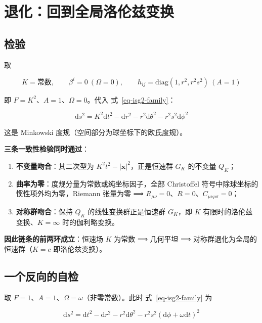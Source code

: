 \documentclass[
  chinese,
  a4paper,
  UTF8,
  12pt,
  oneside,
  openany]{ctexbook}
\providecommand{\tightlist}{%
  \setlength{\itemsep}{0pt}\setlength{\parskip}{0pt}}
\theoremstyle{plain}
\theoremstyle{plain}
\theoremstyle{plain}
\theoremstyle{definition}
\theoremstyle{plain}
\theoremstyle{plain}
\theoremstyle{remark}
\begin{document}
\section{退化：回到全局洛伦兹变换}\label{sec-isg2-degenerate}

\subsection{检验}\label{ux68c0ux9a8c}

取

\[
K=\text{常数},\qquad \beta^{i}=0\ (\Omega=0),\qquad h_{ij}=\mathrm{diag}(1,r^{2},r^{2}s^{2})\ (A=1)
\]

即 \(F=K^{2}\)、\(A=1\)、\(\Omega=0\)。代入 式~\ref{eq-isg2-family}：

\[
\mathrm{d}s^{2}=K^{2}\mathrm{d}t^{2}-\mathrm{d}r^{2}-r^{2}\mathrm{d}\theta^{2}-r^{2}s^{2}\mathrm{d}\phi^{2}
\]

这是 Minkowski 度规（空间部分为球坐标下的欧氏度规）。

\textbf{三条一致性检验同时通过}：

\begin{enumerate}
\def\labelenumi{\arabic{enumi}.}
\tightlist
\item
  \textbf{不变量吻合}：其二次型为
  \(K^{2}t^{2}-\lvert\mathbf{x}\rvert^{2}\)，正是恒速群 \(G_{K}\)
  的不变量 \(Q_K\)；
\item
  \textbf{曲率为零}：度规分量为常数或纯坐标因子，全部 Christoffel
  符号中除球坐标的惯性项外均为零，Riemann 张量为零 ⟹
  \(R_{\mu\nu}=0\)、\(R=0\)、\(C_{\mu\nu\rho\sigma}=0\)；
\item
  \textbf{对称群吻合}：保持 \(Q_K\) 的线性变换群正是恒速群 \(G_K\)，即
  \(K\) 有限时的洛伦兹变换、\(K=\infty\) 时的伽利略变换。
\end{enumerate}

\textbf{因此链条的前两环成立}：恒速场 \(K\) 为常数 ⟹ 几何平坦 ⟹
对称群退化为全局的恒速群（\(K=c\) 即洛伦兹变换）。

\subsection{一个反向的自检}\label{ux4e00ux4e2aux53cdux5411ux7684ux81eaux68c0}

取 \(F=1\)、\(A=1\)、\(\Omega=\omega\)（非零常数）。此时
式~\ref{eq-isg2-family} 为

\[
\mathrm{d}s^{2}=\mathrm{d}t^{2}-\mathrm{d}r^{2}-r^{2}\mathrm{d}\theta^{2}-r^{2}s^{2}(\mathrm{d}\phi+\omega\mathrm{d}t)^{2}
\]
\end{document}
